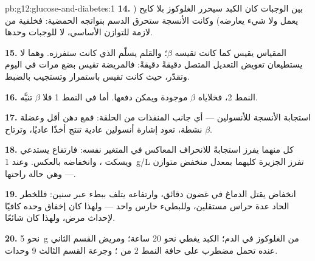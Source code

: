 \begin{solution}{pb:g12:glucose-and-diabetes:1}
\textbf{14.} بين الوجبات كان الكبد سيحرر الغلوكوز بلا كابح (
يعمل ولا شيء يعارضه) وكانت الأنسجة ستحرق الدسم بنواتجه الحمضية: فخلفية
من  لازمة للتوازن الأساسي، لا للوجبات وحدها.

\textbf{15.} المقياس يقيس  كما كانت تقيسه  $\beta$؛
والقلم يسلّم  الذي كانت ستفرزه. وهما لا يستطيعان تعويض
التعديل المتصل دقيقةً دقيقةً: فالمريضة تقيس بضع مرات في اليوم وتقدّر،
حيث كانت  تقيس باستمرار وتستجيب بالضبط.

\textbf{16.} النمط 2، فخلاياه $\beta$ موجودة ويمكن دفعها. أما في النمط
1 فلا  $\beta$ تنبَّه.

\textbf{17.} استجابة الأنسجة للأنسولين --- أي جانب المنفذات من الحلقة:
فمع دهن أقل وعضلة نشطة، تعود إشارة أنسولين عادية تنتج أخذًا عاديًا،
وترتاح  $\beta$.

\textbf{18.} كل منهما يفرز استجابةً للانحراف المعاكس في المتغير نفسه:
فارتفاع  يستدعي  ويسكت ، وانخفاضه بالعكس.
وعند \qty{1}{g/L} تفرز الجزيرة كليهما بمعدل منخفض متوازن --- وهي حالة
راحتها.

\textbf{19.} انخفاض  يقتل الدماغ في غضون دقائق، وارتفاعه يتلف
ببطء عبر سنين: فللخطر الحاد عدة حراس مستقلين، وللبطيء حارس واحد ---
ولهذا كان إخفاق  وحده كافيًا لإحداث مرض، ولهذا كان  شائعًا.

\textbf{20.} نحو \qty{5}{g} من الغلوكوز في الدم؛  الكبد يغطي
نحو 20 ساعة؛ ومريض القسم الثاني عنده تحمل مضطرب على حافة النمط 2 من
؛ وجرعة القسم الثالث 9 وحدات.
\end{solution}
